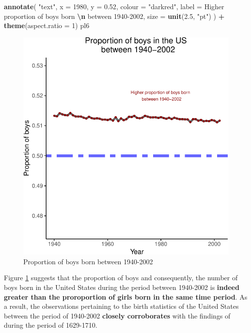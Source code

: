 \documentclass[11pt,a4paper,]{article}
\newenvironment{Shaded}{\begin{snugshade}}{\end{snugshade}}
\newcommand{\AttributeTok}[1]{\textcolor[rgb]{0.13,0.29,0.53}{#1}}
\newcommand{\DecValTok}[1]{\textcolor[rgb]{0.00,0.00,0.81}{#1}}
\newcommand{\FloatTok}[1]{\textcolor[rgb]{0.00,0.00,0.81}{#1}}
\newcommand{\FunctionTok}[1]{\textcolor[rgb]{0.13,0.29,0.53}{\textbf{#1}}}
\newcommand{\NormalTok}[1]{#1}
\newcommand{\SpecialCharTok}[1]{\textcolor[rgb]{0.81,0.36,0.00}{\textbf{#1}}}
\newcommand{\StringTok}[1]{\textcolor[rgb]{0.31,0.60,0.02}{#1}}
\begin{document}
\begin{Shaded}
\begin{Highlighting}[]
  \FunctionTok{annotate}\NormalTok{(}
    \StringTok{"text"}\NormalTok{,}
    \AttributeTok{x =} \DecValTok{1980}\NormalTok{,}
    \AttributeTok{y =} \FloatTok{0.52}\NormalTok{,}
    \AttributeTok{colour =} \StringTok{"darkred"}\NormalTok{,}
    \AttributeTok{label =} \StringTok{\textquotesingle{}Higher proportion of boys born }\SpecialCharTok{\textbackslash{}n}\StringTok{ between 1940{-}2002\textquotesingle{}}\NormalTok{,}
    \AttributeTok{size =} \FunctionTok{unit}\NormalTok{(}\FloatTok{2.5}\NormalTok{, }\StringTok{"pt"}\NormalTok{)}
\NormalTok{  ) }\SpecialCharTok{+} \FunctionTok{theme}\NormalTok{(}\AttributeTok{aspect.ratio =} \DecValTok{1}\NormalTok{)}
\NormalTok{pl6}
\end{Highlighting}
\end{Shaded}

\begin{figure}

\includegraphics{Arindom_Baruah_32779267_files/figure-latex/propboys-1} \hfill{}

\caption{Proportion of boys born between 1940-2002}\label{fig:propboys}
\end{figure}
\normalsize

Figure \ref{fig:propboys} suggests that the proportion of boys and consequently, the number of boys born in the United States during the period between 1940-2002 is \textbf{indeed greater than the proroportion of girls born in the same time period}. As a result, the observations pertaining to the birth statistics of the United States between the period of 1940-2002 \textbf{closely corroborates} with the findings of \textcite{arbuthnot1710ii} during the period of 1629-1710.
\end{document}
